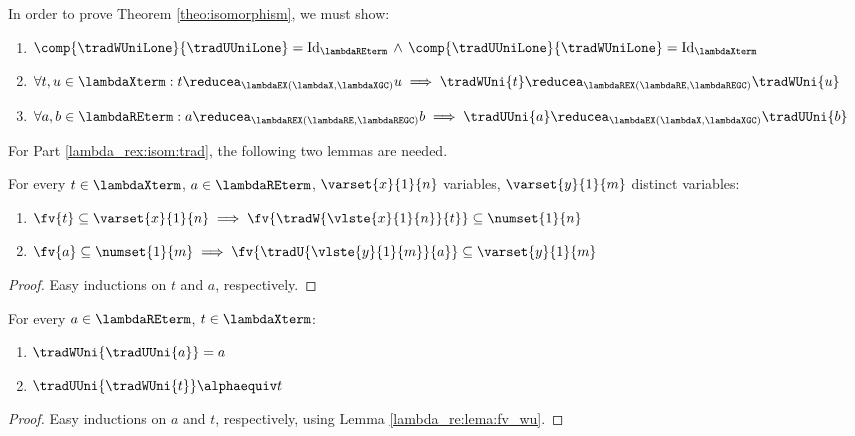 \label{apx:isomorphisms}

In order to prove Theorem \ref{theo:isomorphism}, we must show:

\begin{enumerate}[\hspace{.4cm} A.]
    \item \label{lambda_rex:isom:trad} $\comp{\tradWUniLone}{\tradUUniLone} = \textrm{Id}_{\lambdaREterm} \, \land \, \comp{\tradUUniLone}{\tradWUniLone} = \textrm{Id}_{\lambdaXterm}$
    \item \label{lambda_rex:isom:w_pres} $\forall t, u \in \lambdaXterm : t \reducea_{\lambdaEX (\lambdaX, \lambdaXGC)} u \implies \tradWUni{t} \reducea_{\lambdaREX (\lambdaRE, \lambdaREGC)} \tradWUni{u}$
    \item \label{lambda_rex:isom:u_pres} $\forall a, b \in \lambdaREterm : a \reducea_{\lambdaREX (\lambdaRE, \lambdaREGC)} b \implies \tradUUni{a} \reducea_{\lambdaEX (\lambdaX, \lambdaXGC)} \tradUUni{b}$
\end{enumerate}

For Part \ref{lambda_rex:isom:trad}, the following two lemmas are needed.

\begin{lemma}\label{lambda_re:lema:fv_wu} 
For every $t \in \lambdaXterm$, $a \in \lambdaREterm$, $\varset{x}{1}{n}$ variables, $\varset{y}{1}{m}$ distinct variables:
\begin{enumerate}
    \item $\fv{t} \subseteq \varset{x}{1}{n} \implies \fv{\tradW{\vlste{x}{1}{n}}{t}} \subseteq \numset{1}{n}$
    \item $\fv{a} \subseteq \numset{1}{m} \implies \fv{\tradU{\vlste{y}{1}{m}}{a}} \subseteq \varset{y}{1}{m}$
\end{enumerate}
    \begin{proof}
    \vspace{-.07cm}
    Easy inductions on $t$ and $a$, respectively.
    \end{proof}
\end{lemma}

\begin{lemma}\label{lambda_re:lema:comp} 
For every $a \in \lambdaREterm$, $t \in \lambdaXterm$: 
\begin{enumerate}
    \item $\tradWUni{\tradUUni{a}} = a$
    \item $\tradUUni{\tradWUni{t}} \alphaequiv t$
\end{enumerate}
\vspace{-.3cm}
    \begin{proof}
    Easy inductions on $a$ and $t$, respectively, using Lemma \ref{lambda_re:lema:fv_wu}.
    \end{proof}
\end{lemma}

